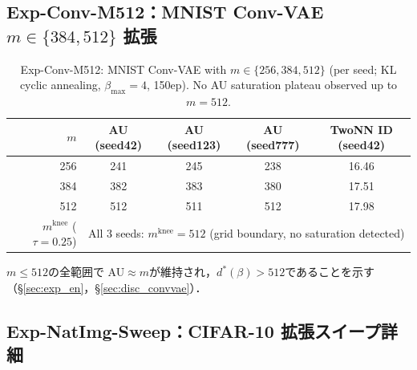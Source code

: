 \documentclass[11pt,a4paper]{jsarticle}
\newcommand{\mknee}{m^{\mathrm{knee}}}
\begin{document}
\subsection*{Exp-Conv-M512：MNIST Conv-VAE $m \in \{384, 512\}$ 拡張}

\begin{table}[H]
\centering
\caption{Exp-Conv-M512: MNIST Conv-VAE with $m \in \{256, 384, 512\}$ (per seed; KL cyclic annealing, $\beta_\mathrm{max}=4$, 150ep). No AU saturation plateau observed up to $m=512$.}
\label{tab:en_ext}
\small
\begin{tabular}{r ccc c}
\toprule
$m$ & AU (seed42) & AU (seed123) & AU (seed777) & TwoNN ID (seed42) \\
\midrule
256 & 241 & 245 & 238 & 16.46 \\
384 & 382 & 383 & 380 & 17.51 \\
512 & 512 & 511 & 512 & 17.98 \\
\midrule
$\mknee$ ($\tau=0.25$) & \multicolumn{4}{c}{All 3 seeds: $\mknee=512$ (grid boundary, no saturation detected)} \\
\bottomrule
\end{tabular}
\end{table}

$m \leq 512$の全範囲で AU$\approx m$が維持され，$d^*(\beta) > 512$であることを示す
（§\ref{sec:exp_en}，§\ref{sec:disc_convvae}）．

\subsection*{Exp-NatImg-Sweep：CIFAR-10 拡張スイープ詳細}
\end{document}
